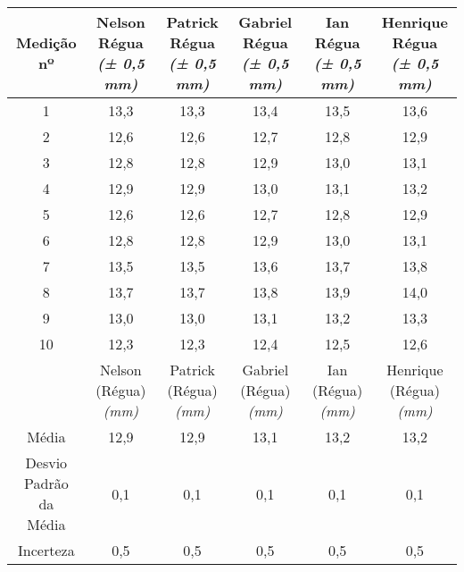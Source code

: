 \documentclass{article}
\begin{document}
\begin{table}[h!]
\centering
\begin{tabular}{c c c c c c }
\toprule
Medição nº & \shortstack{Nelson\\Régua\\\textit{(± 0,5 mm)}} & \shortstack{Patrick\\Régua\\\textit{(± 0,5 mm)}} & \shortstack{Gabriel\\Régua\\\textit{(± 0,5 mm)}} & \shortstack{Ian\\Régua\\\textit{(± 0,5 mm)}} & \shortstack{Henrique\\Régua\\\textit{(± 0,5 mm)}}\\
\midrule
1 & 13,3 & 13,3 & 13,4 & 13,5 & 13,6\\
2 & 12,6 & 12,6 & 12,7 & 12,8 & 12,9\\
3 & 12,8 & 12,8 & 12,9 & 13,0 & 13,1\\
4 & 12,9 & 12,9 & 13,0 & 13,1 & 13,2\\
5 & 12,6 & 12,6 & 12,7 & 12,8 & 12,9\\
6 & 12,8 & 12,8 & 12,9 & 13,0 & 13,1\\
7 & 13,5 & 13,5 & 13,6 & 13,7 & 13,8\\
8 & 13,7 & 13,7 & 13,8 & 13,9 & 14,0\\
9 & 13,0 & 13,0 & 13,1 & 13,2 & 13,3\\
10 & 12,3 & 12,3 & 12,4 & 12,5 & 12,6\\
\midrule
&\shortstack{Nelson\\(Régua)\\\textit{(mm)}} & \shortstack{Patrick\\(Régua)\\\textit{(mm)}} & \shortstack{Gabriel\\(Régua)\\\textit{(mm)}} & \shortstack{Ian\\(Régua)\\\textit{(mm)}} & \shortstack{Henrique\\(Régua)\\\textit{(mm)}}\\
\midrule
Média & 12,9 & 12,9 & 13,1 & 13,2 & 13,2\\[3pt]
\shortstack{Desvio\\Padrão da\\Média} & 0,1 & 0,1 & 0,1 & 0,1 & 0,1\\[3pt]
Incerteza & 0,5 & 0,5 & 0,5 & 0,5 & 0,5\\
\bottomrule
\end{tabular}
\end{table}
\end{document}
